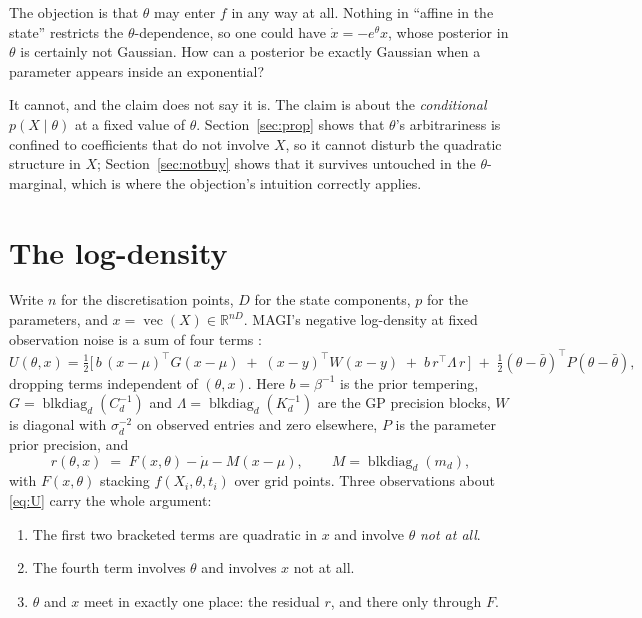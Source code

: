 \documentclass[11pt]{article}
\newcommand{\R}{\mathbb{R}}
\theoremstyle{plain}
\theoremstyle{definition}
\theoremstyle{remark}
\begin{document}
The objection is that $\theta$ may enter $f$ in any way at all. Nothing in ``affine in the state''
restricts the $\theta$-dependence, so one could have $\dot x = -e^{\theta} x$, whose posterior in
$\theta$ is certainly not Gaussian. How can a posterior be exactly Gaussian when a parameter
appears inside an exponential?

It cannot, and the claim does not say it is. The claim is about the \emph{conditional}
$p(X \mid \theta)$ at a fixed value of $\theta$. Section~\ref{sec:prop} shows that $\theta$'s
arbitrariness is confined to coefficients that do not involve $X$, so it cannot disturb the
quadratic structure in $X$; Section~\ref{sec:notbuy} shows that it survives untouched in the
$\theta$-marginal, which is where the objection's intuition correctly applies.

\section{The log-density}
\label{sec:setup}

Write $n$ for the discretisation points, $D$ for the state components, $p$ for the parameters, and
$x = \operatorname{vec}(X) \in \R^{nD}$. MAGI's negative log-density at fixed observation noise is
a sum of four terms \cite{yang2021}:
\begin{equation}
\label{eq:U}
  U(\theta, x) = \tfrac12\Big[\,
    b\,(x-\mu)^\top G (x-\mu)
    \;+\; (x-y)^\top W (x-y)
    \;+\; b\, r^\top \Lambda\, r \,\Big]
  \;+\; \tfrac12 (\theta-\bar\theta)^\top P (\theta-\bar\theta),
\end{equation}
dropping terms independent of $(\theta, x)$. Here $b = \beta^{-1}$ is the prior tempering,
$G = \operatorname{blkdiag}_d(C_d^{-1})$ and $\Lambda = \operatorname{blkdiag}_d(K_d^{-1})$ are the
GP precision blocks, $W$ is diagonal with $\sigma_d^{-2}$ on observed entries and zero elsewhere,
$P$ is the parameter prior precision, and
\begin{equation}
\label{eq:resid}
  r(\theta, x) \;=\; F(x, \theta) - \dot\mu - M(x - \mu), \qquad
  M = \operatorname{blkdiag}_d(m_d),
\end{equation}
with $F(x,\theta)$ stacking $f(X_i, \theta, t_i)$ over grid points. Three observations about
\eqref{eq:U} carry the whole argument:

\begin{enumerate}[leftmargin=1.6em,itemsep=2pt]
\item The first two bracketed terms are quadratic in $x$ and involve $\theta$ \emph{not at all}.
\item The fourth term involves $\theta$ and involves $x$ not at all.
\item $\theta$ and $x$ meet in exactly one place: the residual $r$, and there only through $F$.
\end{enumerate}
\end{document}
